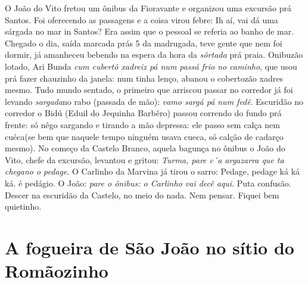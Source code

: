 \documentclass[12pt,brazil,]{book}
\begin{document}
O João do Vito fretou um ônibus da Fioravante e organizou uma excursão
prá Santos. Foi oferecendo as passagens e a coisa virou febre: Ih aí,
vai dá uma sárgada no mar in Santos? Era assim que o pessoal se referia
ao banho de mar. Chegado o dia, saída marcada prás 5 da madrugada, teve
gente que nem foi dormir, já amanheceu bebendo na espera da hora da
\emph{sôrtada} prá praia. Onibuzão lotado, Ari Bunda \emph{cum cubertô
xadreiz pá num passá frio no caminho}, que usou prá fazer chauzinho da
janela: num tinha lenço, abanou o cobertozão xadres mesmo. Tudo mundo
sentado, o primeiro que arriscou passar no corredor já foi levando
\emph{sargada}no rabo (passada de mão): \emph{vamo sargá pá num fedê}.
Escuridão no corredor o Bidú (Eduil do Jequinha Barbêro) passou correndo
do fundo prá frente: só nêgo sargando e tirando a mão depressa: ele
passo sem calça nem cuéca(se bem que naquele tempo ninguém usava cueca,
só calção de cadarço mesmo). No começo da Castelo Branco, aquela bagunça
no ônibus o João do Vito, chefe da excursão, levantou e gritou:
\emph{Turma, pare c´a argazarra que ta chegano o pedage}. O Carlinho da
Marvina já tirou o sarro: Pedage, pedage ká ká ká. é pedágio. O João:
\emph{pare o ônibus: o Carlinho vai decê aqui}. Puta confusão. Descer na
escuridão da Castelo, no meio do nada. Nem pensar. Fiquei bem quietinho.

\section{A fogueira de São João no sítio do
Romãozinho}\label{a-fogueira-de-suxe3o-jouxe3o-no-suxedtio-do-romuxe3ozinho}
\end{document}
